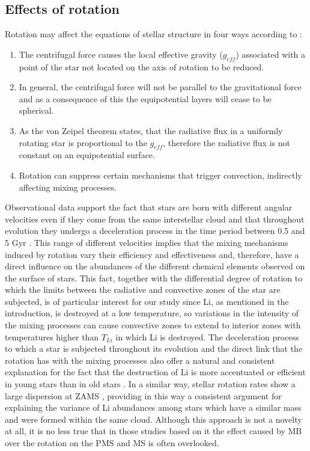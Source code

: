 \documentclass[fleqn,usenatbib]{mnras}
\begin{document}
\subsection{Effects of rotation}
Rotation may affect the equations of stellar structure in four ways according to \citet{Endal1976}:
\begin{enumerate}
    \item The centrifugal force causes the local effective gravity ($g_{eff}$) associated with a point of the star not located on the axis of rotation to be reduced.
    \item In general, the centrifugal force will not be parallel to the gravitational force and as a consequence of this the equipotential layers will cease to be spherical.
    \item As the von Zeipel theorem states, that the radiative flux in a uniformly rotating star is proportional to the $g_{eff}$, therefore the radiative flux is not constant on an equipotential surface.
    \item Rotation can suppress certain mechanisms that trigger convection, indirectly affecting mixing processes.
\end{enumerate}

Observational data support the fact that stars are born with different angular velocities even if they come from the same interstellar cloud and that throughout evolution they undergo a deceleration process \citep{Skumanich1972} in the time period between 0.5 and 5 Gyr \citep{Somers2014a}. This range of different velocities implies that the mixing mechanisms induced by rotation vary their efficiency and effectiveness and, therefore, have a direct influence on the abundances of the different chemical elements observed on the surface of stars.  This fact, together with the differential degree of rotation to which the limits between the radiative and convective zones of the star are subjected, is of particular interest for our study since Li, as mentioned in the introduction, is destroyed at a low temperature, so variations in the intensity of the mixing processes can cause convective zones to extend to interior zones with temperatures higher than $T_{Li}$ in which Li is destroyed. The deceleration process to which a star is subjected throughout its evolution and the direct link that the rotation has with the mixing processes also offer a natural and consistent explanation for the fact that the destruction of Li is more accentuated or efficient in young stars than in old stars \citep{Sestito2005}. In a similar way, stellar rotation rates show a large dispersion at ZAMS \citep{Stauffer1984}, providing in this way a consistent argument for explaining the variance of Li abundances among stars which have a similar mass and were formed within the same cloud. Although this approach is not a novelty at all, it is no less true that in those studies based on it the effect caused by MB over the rotation on the PMS and MS is often overlooked. \par
\end{document}
